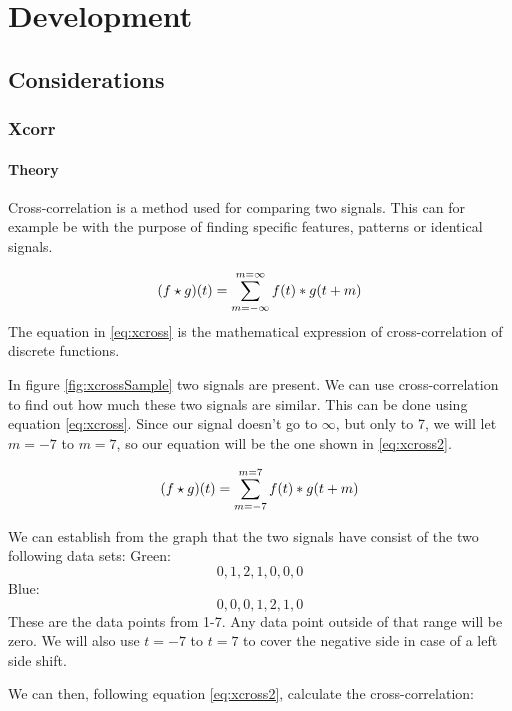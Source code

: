\chapter{Development}
\section{Considerations}
\subsection{Xcorr}
\subsubsection{Theory}
Cross-correlation is a method used for comparing two signals. This can for example be with the purpose of finding specific features, patterns or identical signals.


\begin{equation}
\label{eq:xcross}
\centering
(f\star g)(t)=\sum\limits_{m=-\infty}^{m=\infty}f(t)*g(t+m)
\end{equation}
The equation in \ref{eq:xcross} is the mathematical expression of cross-correlation of discrete functions.

In figure \ref{fig:xcrossSample} two signals are present. We can use cross-correlation to find out how much these two signals are similar. This can be done using equation \ref{eq:xcross}. Since our signal doesn't go to $\infty$, but only to 7, we will let $m=-7$ to $m=7$, so our equation will be the one shown in \ref{eq:xcross2}.

\begin{equation}
\label{eq:xcross2}
\centering
(f\star g)(t)=\sum\limits_{m=-7}^{m=7}f(t)*g(t+m)
\end{equation}

We can establish from the graph that the two signals have consist of the two following data sets:
Green: \[0,1,2,1,0,0,0\]
Blue: \[0,0,0,1,2,1,0\]
These are the data points from 1-7. Any data point outside of that range will be zero. We will also use $t=-7$ to $t=7$ to cover the negative side in case of a left side shift.

We can then, following equation \ref{eq:xcross2}, calculate the cross-correlation:

